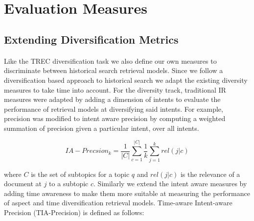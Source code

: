 \section{Evaluation Measures} 
\label{sub:subsection_name}



\subsection{Extending Diversification Metrics} %
\label{sub:diversification_metrics}


\paragraph{}
Like the TREC diversification task we also define our own measures to discriminate between historical search retrieval models. Since we follow a diversification based approach to historical search we adapt the existing diversity measures to take time into account. For the diversity track, traditional IR measures were adapted by adding a dimension of intents to evaluate the performance of retrieval models at diversifying said intents. For example, precision was modified to intent aware precision by computing a weighted summation of precision given a particular intent, over all intents. 

\begin{equation}
IA-Precsion_k=\frac{1}{|C|}\sum_{c=1}^{|C|}\frac{1}{k}\sum_{j=1}^{k}rel(j|c)
\end{equation}

where $C$ is the set of subtopics for a topic $q$ and $rel(j|c)$ is the relevance of a document at $j$ to a subtopic $c$. Similarly we extend the intent aware measures by adding time awareness to make them more suitable at measuring the performance of aspect and time diversification retrieval models. Time-aware Intent-aware Precision (TIA-Precision) is defined as follows:

